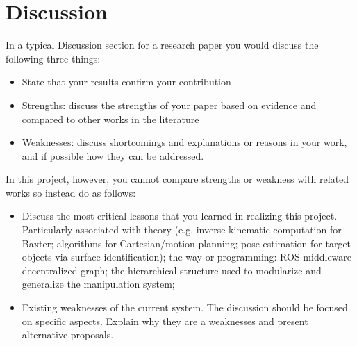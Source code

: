 \documentclass[conference]{IEEEtran}
\begin{document}
\section{Discussion}
In a typical Discussion section for a research paper you would discuss the following three things:\\
\begin{itemize}
    \item State that your results confirm your contribution
    \item Strengths: discuss the strengths of your paper based on evidence and compared to other works in the literature
    \item Weaknesses: discuss shortcomings and explanations or reasons in  your work, and if possible how they can be addressed.
\end{itemize}
In this project, however, you cannot compare strengths or weakness with related works so instead do as follows:
\begin{itemize}
    \item Discuss the most critical lessons that you learned in realizing this project. Particularly associated with theory (e.g. inverse kinematic computation for Baxter; algorithms for Cartesian/motion planning; pose estimation for target objects via surface identification); the way  or programming: ROS middleware decentralized graph; the hierarchical structure used to modularize and generalize the manipulation system;  
    \item Existing weaknesses of the current system. The discussion should be focused on specific aspects. Explain why they are a weaknesses and present alternative proposals. 
\end{itemize}
\end{document}

